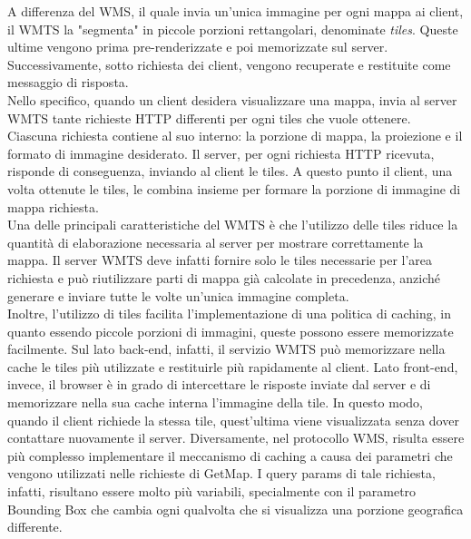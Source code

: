 A differenza del WMS, il quale invia un'unica immagine per ogni mappa ai client, il WMTS la "segmenta" in piccole porzioni rettangolari, denominate \textit{tiles}. Queste ultime vengono prima pre-renderizzate e poi memorizzate sul server. Successivamente, sotto richiesta dei client, vengono recuperate e restituite come messaggio di risposta. 
\\Nello specifico, quando un client desidera visualizzare una mappa, invia al server WMTS tante richieste HTTP differenti per ogni tiles che vuole ottenere. Ciascuna richiesta contiene al suo interno: la porzione di mappa, la proiezione e il formato di immagine desiderato. Il server, per ogni richiesta HTTP ricevuta, risponde di conseguenza, inviando al client le tiles. A questo punto il client, una volta ottenute le tiles, le combina insieme per formare la porzione di immagine di mappa richiesta.
\\Una delle principali caratteristiche del WMTS è che l'utilizzo delle tiles riduce la quantità di elaborazione necessaria al server per mostrare correttamente la mappa. Il server WMTS deve infatti fornire solo le tiles necessarie per l'area richiesta e può riutilizzare parti di mappa già calcolate in precedenza, anziché generare e inviare tutte le volte un'unica immagine completa.
\\Inoltre, l'utilizzo di tiles facilita l'implementazione di una politica di caching, in quanto essendo piccole porzioni di immagini, queste possono essere memorizzate facilmente. Sul lato back-end, infatti, il servizio WMTS può memorizzare nella cache le tiles più utilizzate e restituirle più rapidamente al client. Lato front-end, invece, il browser è in grado di intercettare le risposte inviate dal server e di memorizzare nella sua cache interna l'immagine della tile. In questo modo, quando il client richiede la stessa tile, quest'ultima viene visualizzata senza dover contattare nuovamente il server. Diversamente, nel protocollo WMS, risulta essere più complesso implementare il meccanismo di caching a causa dei parametri che vengono utilizzati nelle richieste di GetMap. I query params di tale richiesta, infatti, risultano essere molto più variabili, specialmente con il parametro Bounding Box che cambia ogni qualvolta che si visualizza una porzione geografica differente.

